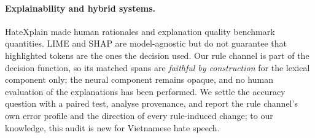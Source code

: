 \paragraph{Explainability and hybrid systems.}
HateXplain \cite{mathew2021hatexplain} made human rationales and explanation quality
benchmark quantities. LIME \cite{ribeiro2016why} and SHAP \cite{lundberg2017shap} are
model-agnostic but do not guarantee that highlighted tokens are the ones the decision
used. Our rule channel is part of the decision function, so its matched spans are
\emph{faithful by construction} for the lexical component only; the neural component
remains opaque, and no human evaluation of the explanations has been performed. We settle the accuracy question with a paired test, analyse provenance,
and report the rule channel's own error profile and the direction of every
rule-induced change; to our knowledge, this audit is new for Vietnamese hate speech.
